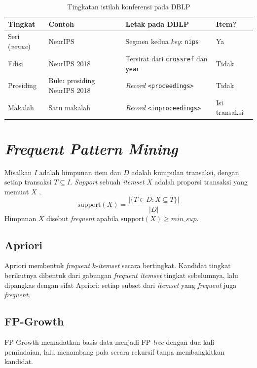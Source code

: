 \begin{table}[!htb]
\caption{Tingkatan istilah konferensi pada DBLP}
\label{tab:istilah}
\small
\begin{tabularx}{\textwidth}{@{}llXl@{}}
\toprule
\textbf{Tingkat} & \textbf{Contoh} & \textbf{Letak pada DBLP} & \textbf{Item?} \\
\midrule
Seri (\textit{venue}) & NeurIPS & Segmen kedua \textit{key}: \texttt{nips} & Ya \\
\midrule
Edisi & NeurIPS 2018 & Tersirat dari \texttt{crossref} dan \texttt{year} & Tidak \\
\midrule
Prosiding & Buku prosiding NeurIPS 2018 & \textit{Record} \texttt{<proceedings>} & Tidak \\
\midrule
Makalah & Satu makalah & \textit{Record} \texttt{<inproceedings>} & Isi transaksi \\
\bottomrule
\end{tabularx}
\end{table}

\section{\textit{Frequent Pattern Mining}}
Misalkan $I$ adalah himpunan item dan $D$ adalah kumpulan transaksi, dengan setiap transaksi $T \subseteq I$. \textit{Support} sebuah \textit{itemset} $X$ adalah proporsi transaksi yang memuat $X$ \cite{han2012}.
\begin{equation}
\mathrm{support}(X) = \frac{|\{T \in D : X \subseteq T\}|}{|D|}
\end{equation}
Himpunan $X$ disebut \textit{frequent} apabila $\mathrm{support}(X) \geq \textit{min\_sup}$.

\subsection{Apriori}
Apriori \cite{agrawal1994} membentuk \textit{frequent} $k$-\textit{itemset} secara bertingkat. Kandidat tingkat berikutnya dibentuk dari gabungan \textit{frequent itemset} tingkat sebelumnya, lalu dipangkas dengan sifat Apriori: setiap subset dari \textit{itemset} yang \textit{frequent} juga \textit{frequent}.

\subsection{FP-Growth}
FP-Growth \cite{han2000} memadatkan basis data menjadi FP-\textit{tree} dengan dua kali pemindaian, lalu menambang pola secara rekursif tanpa membangkitkan kandidat.

